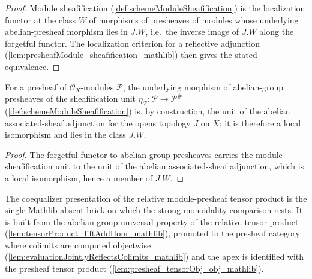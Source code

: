 \begin{proof}
  \leanok
  Module sheafification (\cref{def:schemeModuleSheafification}) is the localization
  functor at the class \(W\) of morphisms of presheaves of modules whose underlying
  abelian-presheaf morphism lies in \(J.W\), i.e.\ the inverse image of \(J.W\) along
  the forgetful functor. The localization criterion for a reflective adjunction
  (\cref{lem:presheafModule_sheafification_mathlib}) then gives the stated
  equivalence.
\end{proof}


\begin{lemma}
  \label{lem:localIso_toPresheaf_map_unit}
  For a presheaf of \(\mathcal{O}_X\)-modules \(\mathcal{P}\), the underlying
  morphism of abelian-group presheaves of the sheafification unit
  \(\eta_{\mathcal{P}} : \mathcal{P} \to \mathcal{P}^{\#}\)
  (\cref{def:schemeModuleSheafification}) is, by construction, the unit of the
  abelian associated-sheaf adjunction for the opens topology \(J\) on \(X\); it is
  therefore a local isomorphism and lies in the class \(J.W\).
\end{lemma}

\begin{proof}
  \leanok
  The forgetful functor to abelian-group presheaves carries the module
  sheafification unit to the unit of the abelian associated-sheaf adjunction, which
  is a local isomorphism, hence a member of \(J.W\).
\end{proof}













The coequalizer presentation of the relative module-presheaf tensor product is
the single Mathlib-absent brick on which the strong-monoidality comparison rests.
It is built from the abelian-group universal property of the relative tensor
product (\cref{lem:tensorProduct_liftAddHom_mathlib}), promoted to the presheaf
category where colimits are computed objectwise
(\cref{lem:evaluationJointlyReflectsColimits_mathlib}) and the apex is identified
with the presheaf tensor product (\cref{lem:presheaf_tensorObj_obj_mathlib}).

